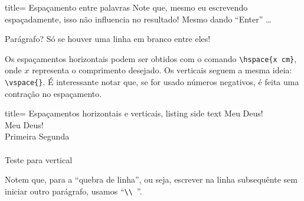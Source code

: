 \begin{tcblisting}{title= Espaçamento entre palavras}
  Note         que, mesmo        eu    escrevendo
  espaçadamente, isso não    influencia no
  resultado!
  Mesmo dando ``Enter'' \ldots
  
  Parágrafo? Só se houver uma linha em branco entre eles!
\end{tcblisting}

Os espaçamentos \textsf{horizontais} podem ser obtidos com o comando 
\Verb|\hspace{x cm}|, onde $x$ representa o comprimento desejado.
Os \textsf{verticais} seguem a mesma ideia: \Verb|\vspace{}|.
É interessante notar que, se for usado números negativos, é feita uma contração 
no espaçamento. 

\begin{tcblisting}{title= Espaçamentos horizontais e verticais, listing side text}
Meu \hspace{2cm} Deus!\\
Meu \hspace{-0.5cm} Deus!\\
Primeira \hfill Segunda\\
\vspace*{0.7cm}\\
Teste para vertical
\end{tcblisting}  

Notem que, para a ``quebra de linha'', ou seja, escrever na linha subsequênte sem
iniciar outro parágrafo, usamos ``\Verb|\\ |''.
